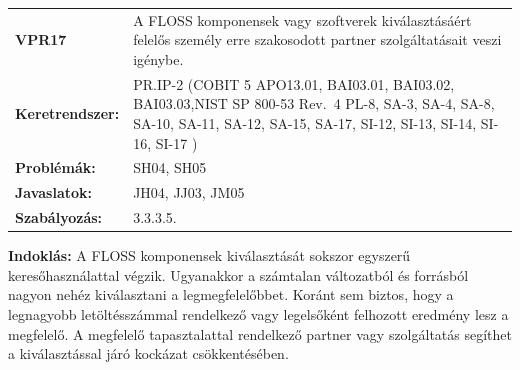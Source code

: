 \documentclass[12pt,magyar,a4paper,oneside]{scrreprt}
\begin{document}
\begin{longtable}[]{@{}ll@{}}
\toprule
\endhead
\begin{minipage}[t]{0.16\columnwidth}\raggedright
\textbf{VPR17}\strut
\end{minipage} & \begin{minipage}[t]{0.79\columnwidth}\raggedright
A FLOSS komponensek vagy szoftverek kiválasztásáért felelős személy erre
szakosodott partner szolgáltatásait veszi igénybe.\strut
\end{minipage}\tabularnewline
\begin{minipage}[t]{0.16\columnwidth}\raggedright
\textbf{Keretrendszer:}\strut
\end{minipage} & \begin{minipage}[t]{0.79\columnwidth}\raggedright
PR.IP-2 (COBIT 5 APO13.01, BAI03.01, BAI03.02, BAI03.03,NIST SP 800-53
Rev.~4 PL-8, SA-3, SA-4, SA-8, SA-10, SA-11, SA-12, SA-15, SA-17, SI-12,
SI-13, SI-14, SI-16, SI-17 )\strut
\end{minipage}\tabularnewline
\begin{minipage}[t]{0.16\columnwidth}\raggedright
\textbf{Problémák:}\strut
\end{minipage} & \begin{minipage}[t]{0.79\columnwidth}\raggedright
SH04, SH05\strut
\end{minipage}\tabularnewline
\begin{minipage}[t]{0.16\columnwidth}\raggedright
\textbf{Javaslatok:}\strut
\end{minipage} & \begin{minipage}[t]{0.79\columnwidth}\raggedright
JH04, JJ03, JM05\strut
\end{minipage}\tabularnewline
\begin{minipage}[t]{0.16\columnwidth}\raggedright
\textbf{Szabályozás:}\strut
\end{minipage} & \begin{minipage}[t]{0.79\columnwidth}\raggedright
3.3.3.5.\strut
\end{minipage}\tabularnewline
\bottomrule
\end{longtable}

\textbf{Indoklás: } A FLOSS komponensek kiválasztását sokszor egyszerű
keresőhasználattal végzik. Ugyanakkor a számtalan változatból és
forrásból nagyon nehéz kiválasztani a legmegfelelőbbet. Koránt sem
biztos, hogy a legnagyobb letöltésszámmal rendelkező vagy legelsőként
felhozott eredmény lesz a megfelelő. A megfelelő tapasztalattal
rendelkező partner vagy szolgáltatás segíthet a kiválasztással járó
kockázat csökkentésében.
\end{document}
